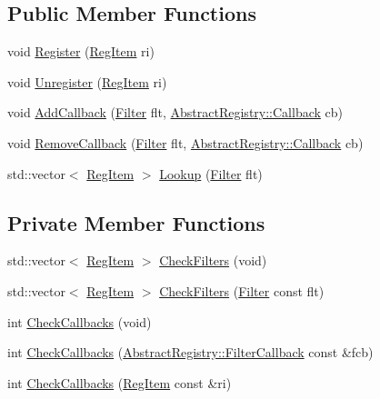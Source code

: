 \subsection*{Public Member Functions}
\begin{DoxyCompactItemize}
\item 
void \hyperlink{classregistry_1_1RegistryImplVec_a2e013966fed946839ab30a7b53139f0c}{Register} (\hyperlink{classregistry_1_1RegItem}{Reg\+Item} ri)
\item 
void \hyperlink{classregistry_1_1RegistryImplVec_a20af3b007fe31128891f31f3316997a4}{Unregister} (\hyperlink{classregistry_1_1RegItem}{Reg\+Item} ri)
\item 
void \hyperlink{classregistry_1_1RegistryImplVec_ae0fc63512abc9c7be1d281c69ee6f6c8}{Add\+Callback} (\hyperlink{classregistry_1_1Filter}{Filter} flt, \hyperlink{classregistry_1_1AbstractRegistry_a08a798ca9ca1c4c983ebd2386ca3c315}{Abstract\+Registry\+::\+Callback} cb)
\item 
void \hyperlink{classregistry_1_1RegistryImplVec_a47e0a151624f8d4e809554255c993125}{Remove\+Callback} (\hyperlink{classregistry_1_1Filter}{Filter} flt, \hyperlink{classregistry_1_1AbstractRegistry_a08a798ca9ca1c4c983ebd2386ca3c315}{Abstract\+Registry\+::\+Callback} cb)
\item 
std\+::vector$<$ \hyperlink{classregistry_1_1RegItem}{Reg\+Item} $>$ \hyperlink{classregistry_1_1RegistryImplVec_aa867888a52cd296e94f30da2770529ce}{Lookup} (\hyperlink{classregistry_1_1Filter}{Filter} flt)
\end{DoxyCompactItemize}
\subsection*{Private Member Functions}
\begin{DoxyCompactItemize}
\item 
std\+::vector$<$ \hyperlink{classregistry_1_1RegItem}{Reg\+Item} $>$ \hyperlink{classregistry_1_1RegistryImplVec_a44a27ef2dcfcf59576edc026a399c78e}{Check\+Filters} (void)
\item 
std\+::vector$<$ \hyperlink{classregistry_1_1RegItem}{Reg\+Item} $>$ \hyperlink{classregistry_1_1RegistryImplVec_a4c826485077a8b185fbf8e38bdf8da1c}{Check\+Filters} (\hyperlink{classregistry_1_1Filter}{Filter} const flt)
\item 
int \hyperlink{classregistry_1_1RegistryImplVec_a45712295c9558548a46c233317805a9c}{Check\+Callbacks} (void)
\item 
int \hyperlink{classregistry_1_1RegistryImplVec_a05d49297a34cfdcd1ef6e899b570671f}{Check\+Callbacks} (\hyperlink{classregistry_1_1AbstractRegistry_a31f6bef634dcd324efebaf55f99b950f}{Abstract\+Registry\+::\+Filter\+Callback} const \&fcb)
\item 
int \hyperlink{classregistry_1_1RegistryImplVec_a08f4abec49253bdeac357e6ebc02fff8}{Check\+Callbacks} (\hyperlink{classregistry_1_1RegItem}{Reg\+Item} const \&ri)
\end{DoxyCompactItemize}
